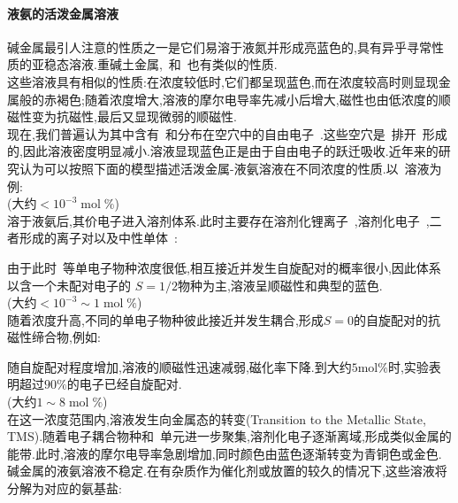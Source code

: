 \documentclass{ctexbook}
\begin{document}
\paragraph{液氨的活泼金属溶液}
碱金属最引人注意的性质之一是它们易溶于液氮并形成亮蓝色的,具有异乎寻常性质的亚稳态溶液.重碱土金属,~和~也有类似的性质.\\
\indent 这些溶液具有相似的性质:在浓度较低时,它们都呈现蓝色,而在浓度较高时则显现金属般的赤褐色;随着浓度增大,溶液的摩尔电导率先减小后增大,磁性也由低浓度的顺磁性变为抗磁性,最后又显现微弱的顺磁性.\\
\indent 现在,我们普遍认为其中含有~和分布在空穴中的自由电子~.这些空穴是~排开~形成的,因此溶液密度明显减小.溶液显现蓝色正是由于自由电子的跃迁吸收.近年来的研究认为可以按照下面的模型描述活泼金属-液氨溶液在不同浓度的性质\cite{Zurek2009}.以~溶液为例:\\
(大约$<10^{-3}\;\si{\mole}\;\%$)\\
\indent {}溶于液氨后,其价电子进入溶剂体系.此时主要存在溶剂化锂离子~\ce{[Li(NH3)4]+},溶剂化电子~,二者形成的离子对以及中性单体~:
\begin{tightcenter}
\end{tightcenter}
由于此时~等单电子物种浓度很低,相互接近并发生自旋配对的概率很小,因此体系以含一个未配对电子的 $S=1/2$物种为主,溶液呈顺磁性和典型的蓝色.\\
(大约$<10^{-3}\sim1\;\si{\mole}\;\%$)\\
\indent 随着浓度升高,不同的单电子物种彼此接近并发生耦合,形成$S=0$的自旋配对的抗磁性缔合物,例如:
\begin{tightcenter}
    \qquad{}
\end{tightcenter}
随自旋配对程度增加,溶液的顺磁性迅速减弱,磁化率下降.到大约$5\si{\mole}\%$时,实验表明超过$90\%$的电子已经自旋配对.\\
(大约$1\sim8\;\si{\mole}\;\%$)\\
\indent 在这一浓度范围内,溶液发生向金属态的转变(Transition to the Metallic State, TMS).随着电子耦合物种和~单元进一步聚集,溶剂化电子逐渐离域,形成类似金属的能带.此时,溶液的摩尔电导率急剧增加,同时颜色由蓝色逐渐转变为青铜色或金色.
\indent 碱金属的液氨溶液不稳定.在有杂质作为催化剂或放置的较久的情况下,这些溶液将分解为对应的氨基盐:
\begin{tightcenter}
\end{tightcenter}
\end{document}
